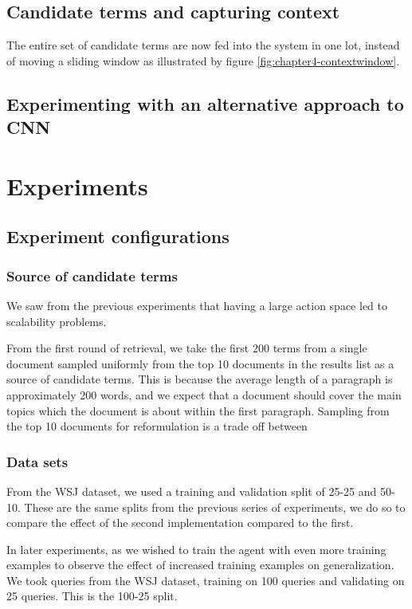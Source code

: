 \subsection{Candidate terms and capturing context}
The entire set of candidate terms are now fed into the system in one lot, instead of moving a sliding window as illustrated by figure \ref{fig:chapter4-contextwindow}. 
\subsection{Experimenting with an alternative approach to CNN}



\section{Experiments}


\subsection{Experiment configurations}
\subsubsection{Source of candidate terms}

We saw from the previous experiments that having a large action space led to scalability problems. 

From the first round of retrieval, we take the first 200 terms from a single document sampled uniformly from the top 10 documents in the results list as a source of candidate terms. This is because the average length of a paragraph is approximately 200 words, and we expect that a document should cover the main topics which the document is about within the first paragraph. Sampling from the top 10 documents for reformulation is a trade off between 


\subsubsection{Data sets}

From the WSJ dataset, we used a training and validation split of 25-25 and 50-10. These are the same splits from the previous series of experiments, we do so to compare the effect of the second implementation compared to the first.

In later experiments, as we wished to train the agent with even more training examples to observe the effect of increased training examples on generalization. We took queries from the WSJ dataset, training on 100 queries and validating on 25 queries. This is the 100-25 split.

